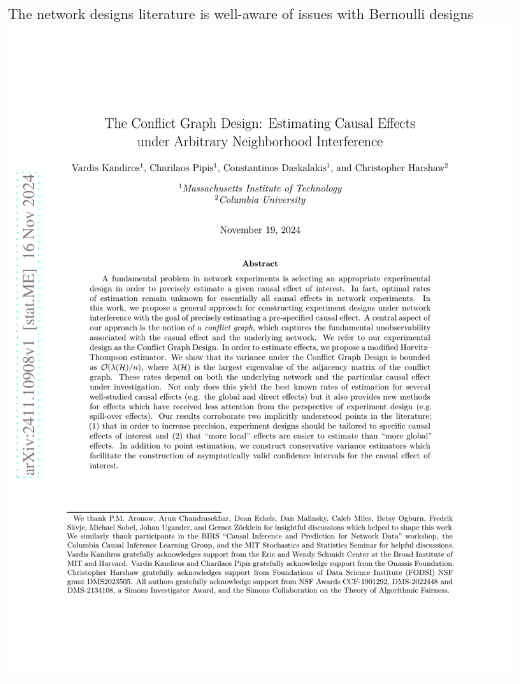 \documentclass[aspectratio=169]{beamer}
\theoremstyle{remark}
\begin{document}
\begin{frame}{The network designs literature is well-aware of issues with Bernoulli designs}
    \vfill
    \centering
    \includegraphics[height=0.95\textheight, page=1, trim={2.5cm 8cm 0 3cm}, clip]{./papers/conflict.pdf}
\end{frame}
\end{document}
